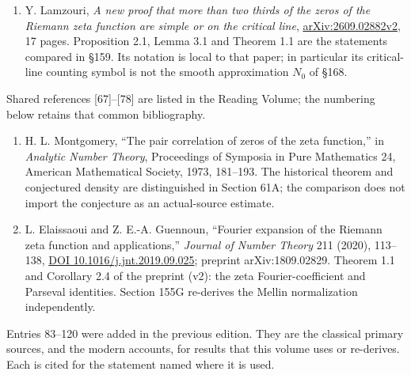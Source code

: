 \documentclass[
  11pt,
]{book}
\begin{document}
\begin{enumerate}
  A. Edelman and G. Strang, \emph{Pascal Matrices},
  \href{https://web.mit.edu/18.06/www/Essays/pascal-work.pdf}{MIT course
  essay}. Classical symmetric Pascal matrix, Vandermonde factorization,
  and determinant one. Section 163A identifies this matrix inside the
  completed-source energy.
\item
  Y. Lamzouri, \emph{A new proof that more than two thirds of the zeros
  of the Riemann zeta function are simple or on the critical line},
  \href{https://arxiv.org/abs/2609.02882}{arXiv:2609.02882v2}, 17 pages.
  Proposition 2.1, Lemma 3.1 and Theorem 1.1 are the statements compared
  in §159. Its notation is local to that paper; in particular its
  critical-line counting symbol is not the smooth approximation \(N_0\)
  of §168.
\end{enumerate}

Shared references {[}67{]}--{[}78{]} are listed in the Reading Volume;
the numbering below retains that common bibliography.

\begin{enumerate}
\def\labelenumi{\arabic{enumi}.}
\setcounter{enumi}{78}
\item
  H. L. Montgomery, ``The pair correlation of zeros of the zeta
  function,'' in \emph{Analytic Number Theory}, Proceedings of Symposia
  in Pure Mathematics 24, American Mathematical Society, 1973, 181--193.
  The historical theorem and conjectured density are distinguished in
  Section 61A; the comparison does not import the conjecture as an
  actual-source estimate.
\item
  L. Elaissaoui and Z. E.-A. Guennoun, ``Fourier expansion of the
  Riemann zeta function and applications,'' \emph{Journal of Number
  Theory} 211 (2020), 113--138,
  \href{https://doi.org/10.1016/j.jnt.2019.09.025}{DOI
  10.1016/j.jnt.2019.09.025}; preprint arXiv:1809.02829. Theorem 1.1 and
  Corollary 2.4 of the preprint (v2): the zeta Fourier-coefficient and
  Parseval identities. Section 155G re-derives the Mellin normalization
  independently.
\end{enumerate}

Entries 83--120 were added in the previous edition. They are the
classical primary sources, and the modern accounts, for results that
this volume uses or re-derives. Each is cited for the statement named
where it is used.
\end{document}
